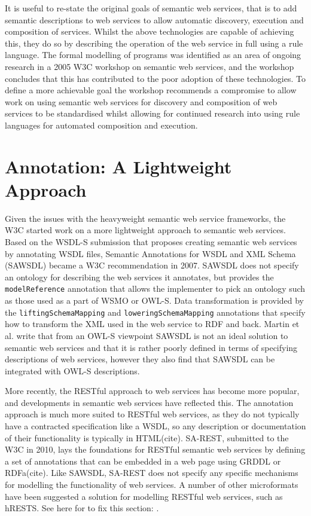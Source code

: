 It is useful to re-state the original goals of semantic web services, that is to add
semantic descriptions to web services to allow automatic discovery, execution
and composition of services. Whilst the above technologies are capable of
achieving this, they do so by describing the operation of the web service in
full using a rule language. The formal modelling of programs was identified as an area of
ongoing research in a 2005 W3C workshop on semantic web services, and the
workshop concludes that this has contributed to the poor adoption of these 
technologies\cite{battle_report_????}. To define a more achievable goal 
the workshop recommends a compromise to
allow work on using semantic web services for discovery and composition of web
services to be standardised whilst allowing for continued research into using
rule languages for automated composition and execution.

\section{Annotation: A Lightweight Approach}

Given the issues with the heavyweight semantic web service frameworks, the W3C
started work on a more lightweight approach to semantic web services. Based on
the WSDL-S submission that proposes creating semantic web services by annotating
WSDL files, Semantic Annotations for WSDL and XML Schema (SAWSDL) became a W3C
recommendation in 2007. SAWSDL does not specify an ontology for describing the
web services it annotates, but provides the \verb=modelReference= annotation that allows the
implementer to pick an ontology such as those used as a part of  WSMO or OWL-S.
Data transformation is
provided by the \verb=liftingSchemaMapping= and \verb=loweringSchemaMapping=
annotations that specify how to transform the XML used in the web service to
RDF and back. Martin et al. write that from an OWL-S viewpoint SAWSDL is not an
ideal solution to semantic web services and that it is rather poorly defined
in terms of specifying descriptions of web services, however they also find that
SAWSDL can be integrated with OWL-S descriptions\cite{martin_bringing_2007}.

More recently, the RESTful approach to web services has become more popular, and
developments in semantic web services have reflected this. The annotation
approach is much more suited to RESTful web services, as they do not typically
have a contracted specification like a WSDL, so any description or documentation
of their functionality is typically in HTML(cite). SA-REST, submitted to the W3C
in 2010, lays the foundations for RESTful semantic web services by defining a
set of annotations that can be embedded in a web page using GRDDL or RDFa(cite).
Like SAWSDL, SA-REST does not specify any specific mechanisms for modelling the
functionality of web services. A number of other microformats have been
suggested a solution for modelling RESTful web services, such as
hRESTS. See here for to fix this section: \cite{maleshkova_adapting_2009}.


